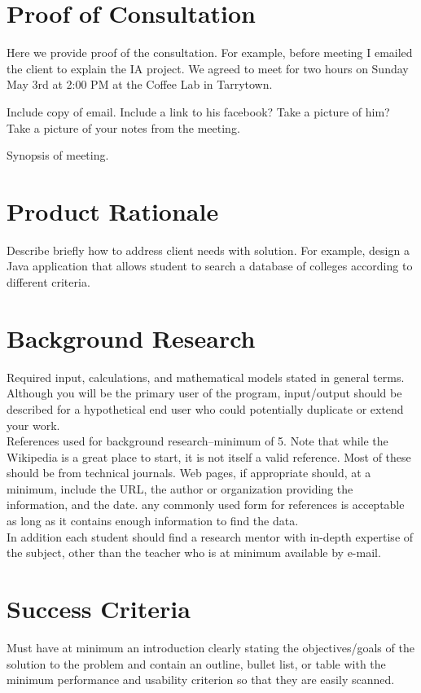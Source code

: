 \documentclass{tufte-book}
\begin{document}
\section{Proof of Consultation}
Here we provide proof of the consultation.  For example, before meeting I emailed the client to explain the IA project.  We agreed to meet for two hours on Sunday May 3rd at 2:00 PM at the Coffee Lab in Tarrytown.

Include copy of email.  Include a link to his facebook?  Take a picture of him?  Take a picture of your notes from the meeting.

Synopsis of meeting.

\section{Product Rationale}
Describe briefly how to address client needs with solution.  For example, design a Java application that allows student to search a database of colleges according to different criteria.
\cite{Tufte1990}

\section{Background Research}
Required input, calculations, and mathematical models stated in general terms. Although you will be the primary user of the program, input/output should be described for a hypothetical end user who could potentially duplicate or extend your work.\\
References used for background research--minimum of 5. Note that while the Wikipedia is a great place to start, it is not itself a valid reference. Most of these should be from technical journals. Web pages, if appropriate should, at a minimum, include the URL, the author or organization providing the information, and the date. any commonly used form for references is acceptable as long as it contains enough information to find the data.\\
In addition each student should find a research mentor with in-depth expertise of the subject, other than the teacher who is at minimum available by e-mail.
\cite{Tufte1990}
\cite{Tufte2006}
\cite{pkg-geometry}
\cite{Mittelbach2004}
\cite{Bringhurst2005}
\newpage 

\section{Success Criteria}
Must have at minimum an introduction clearly stating the objectives/goals of the solution to the problem and contain an outline, bullet list, or table with the minimum performance and usability criterion so that they are easily scanned.\\
\end{document}
